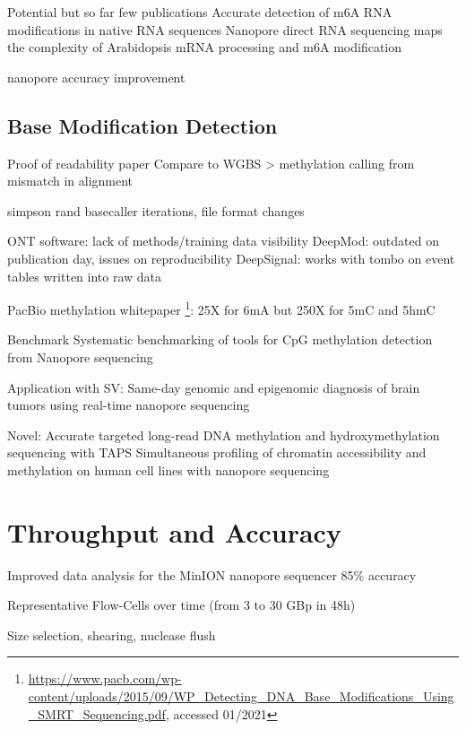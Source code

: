 Potential but so far few publications
Accurate detection of m6A RNA modifications in native RNA sequences \cite{Liu2019}
Nanopore direct RNA sequencing maps the complexity of Arabidopsis mRNA processing and m6A modification \cite{Parker2020}

nanopore accuracy improvement




\subsection{Base Modification Detection}
\label{subsec:state_of_art:basemod}

Proof of readability paper \cite{Schreiber2013}
Compare to WGBS > methylation calling from mismatch in alignment

simpson \cite{Simpson2017}
rand \cite{Rand2017}
basecaller iterations, file format changes

ONT software: lack of methods/training data visibility
DeepMod: outdated on publication day, issues on reproducibility
DeepSignal: works with tombo on event tables written into raw data

PacBio methylation whitepaper \footnote{\url{https://www.pacb.com/wp-content/uploads/2015/09/WP_Detecting_DNA_Base_Modifications_Using_SMRT_Sequencing.pdf}, accessed 01/2021}:
25X for 6mA but 250X for 5mC and 5hmC

Benchmark
Systematic benchmarking of tools for CpG methylation detection from Nanopore sequencing \cite{Yuen2020}

Application with SV:
Same-day genomic and epigenomic diagnosis of brain tumors using real-time nanopore sequencing \cite{Euskirchen2017}

Novel:
Accurate targeted long-read DNA methylation and hydroxymethylation sequencing with TAPS \cite{Liu2020}
Simultaneous profiling of chromatin accessibility and methylation on human cell lines with nanopore sequencing \cite{Lee2020}




\section{Throughput and Accuracy}
\label{sec:stat_of_art:throughput}

Improved data analysis for the {MinION} nanopore sequencer \cite{Jain2015} 85\% accuracy

Representative Flow-Cells over time (from 3 to 30 GBp in 48h)

Size selection, shearing, nuclease flush

